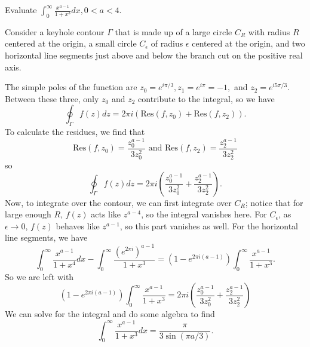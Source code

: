 \documentclass[12pt]{article}
\begin{document}

\begin{statement}[7]
  Evaluate $\int^{\infty}_{0} \frac{x^{a-1}}{1+x^3}dx, 0 < a < 4$. 
\end{statement}
\begin{newproof}
    Consider a keyhole contour $\Gamma$ that is made up of a large circle $C_R$ with radius $R$ centered at the origin, a small circle $C_{\epsilon}$ of radius $\epsilon$ centered at the origin, and two horizontal line segments just above and below the branch cut on the positive real axis.
    \par The simple poles of the function are $z_0=e^{i \pi / 3}, z_1=e^{i \pi} = -1,$ and $z_2=e^{i 5 \pi/3}$. Between these three, only $z_0$ and $z_2$ contribute to the integral, so we have 
    $$ \oint_{\Gamma} f(z)dz=2\pi i (\text{Res}(f,z_0) + \text{Res}(f,z_2)). $$
    To calculate the residues, we find that 
    $$ \text{Res}(f,z_0)= \frac{z_0^{a-1}}{3z_0^2} \text{ and } \text{Res}(f,z_2)=\frac{z_2^{a-1}}{3z_2^2} $$
    so  
    $$ \oint_{\Gamma} f(z)dz=2\pi i \left( \frac{z_0^{a-1}}{3z_0^2} + \frac{z_2^{a-1}}{3z_2^2}\right). $$
    Now, to integrate over the contour, we can first integrate over $C_R$; notice that for large enough $R$, $f(z)$ acts like $z^{a-4}$, so the integral vanishes here. For $C_{\epsilon}$, as $\epsilon \to 0$, $f(z)$ behaves like $z^{a-1}$, so this part vanishes as well.
    For the horizontal line segments, we have 
    $$ \int^{\infty}_0 \frac{x^{a-1}}{1+x^4}dx-\int^{\infty}_0 \frac{(e^{2\pi i})^{a-1}}{1+x^3} = \left(1-e^{2 \pi i (a-1)}\right)\int^{\infty}_0 \frac{x^{a-1}}{1+x^3}.$$
    So we are left with 
    $$ \left(1-e^{2 \pi i (a-1)}\right)\int^{\infty}_0 \frac{x^{a-1}}{1+x^3} = 2\pi i \left( \frac{z_0^{a-1}}{3z_0^2} + \frac{z_2^{a-1}}{3z_2^2}\right)$$
    We can solve for the integral and do some algebra to find 
    $$ \int^{\infty}_0 \frac{x^{a-1}}{1+x^3} dx = \frac{\pi}{3\sin(\pi a / 3)}.$$
\end{newproof}

\end{document}
